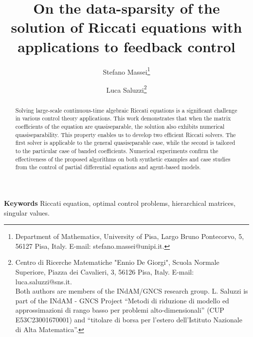 \documentclass[a4paper,10pt]{article}
\author{
	Stefano Massei\footnote{Department of Mathematics, University of Pisa,  Largo Bruno Pontecorvo, 5, 56127 Pisa, Italy.
		E-mail: stefano.massei@unipi.it. } 
	\and
	Luca Saluzzi\footnote{Centro di Ricerche Matematiche "Ennio De Giorgi", 
Scuola Normale Superiore, Piazza dei Cavalieri, 3,
56126 Pisa, Italy. E-mail: luca.saluzzi@sns.it. \\
		Both authors are members of the INdAM/GNCS research group. L. Saluzzi is part of the INdAM - GNCS Project ``Metodi di riduzione di modello ed approssimazioni di rango basso per problemi alto-dimensionali'' (CUP E53C23001670001) and ``titolare di borsa per l’estero dell'Istituto Nazionale di Alta Matematica”.}}
\title{On the data-sparsity of the solution of Riccati equations with  applications to feedback control}
\date{}
\begin{document}
	\maketitle
	
\begin{abstract}
Solving large-scale continuous-time algebraic Riccati equations is a significant challenge in various control theory applications. This work demonstrates that when the matrix coefficients of the equation are quasiseparable, the solution also exhibits numerical quasiseparability. This property enables us to develop  two efficient Riccati solvers. The first solver is applicable to the general quasiseparable case, while the second is tailored to the particular case of banded coefficients. Numerical experiments confirm the effectiveness of the proposed algorithms on both synthetic examples and case studies from the control of partial differential equations and agent-based models.
\end{abstract}

	\noindent \textbf{Keywords} Riccati equation, optimal control problems, 
hierarchical matrices, singular values. \\
	
\end{document}
